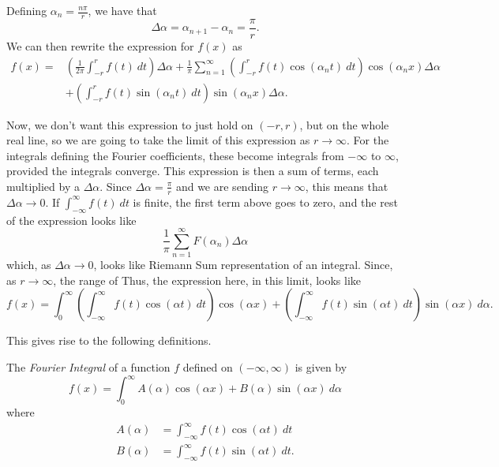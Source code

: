Defining $\alpha_n = \frac{n\pi}{r}$, we have that \[ \Delta \alpha = \alpha_{n+1} - \alpha_n = \frac{\pi}{r}. \] We can then rewrite the expression for $f(x)$ as 
\[ \begin{split} 
f(x) =&  \left( \frac{1}{2\pi} \int_{-r}^{r} f(t)\ dt \right) \Delta \alpha  + \frac{1}{\pi} \sum_{n=1}^\infty \left( \int_{-r}^r f(t) \cos\left(\alpha_n t\right)\ dt\right) \cos\left(\alpha_n x\right) \Delta \alpha  \\
&+ \left(\int_{-r}^r f(t) \sin\left(\alpha_n t\right)\ dt\right) \sin\left(\alpha_n x\right) \Delta \alpha.
\end{split} \]

Now, we don't want this expression to just hold on $(-r, r)$, but on the whole real line, so we are going to take the limit of this expression as $r \rightarrow \infty$. For the integrals defining the Fourier coefficients, these become integrals from $-\infty$ to $\infty$, provided the integrals converge. This expression is then a sum of terms, each multiplied by a $\Delta \alpha$. Since $\Delta \alpha = \frac{\pi}{r}$ and we are sending $r\rightarrow \infty$, this means that $\Delta \alpha \rightarrow 0$. If $\int_{-\infty}^\infty f(t)\ dt$ is finite, the first term above goes to zero, and the rest of the expression looks like
\[ \frac{1}{\pi} \sum_{n=1}^\infty F(\alpha_n) \Delta \alpha \] which, as $\Delta \alpha \rightarrow 0$, looks like Riemann Sum representation of an integral. Since, as $r \rightarrow \infty$, the range of Thus, the expression here, in this limit, looks like
\[ f(x) = \int_0^\infty \left( \int_{-\infty}^\infty f(t) \cos\left(\alpha t\right)\ dt\right) \cos\left(\alpha x\right) + \left( \int_{-\infty}^\infty f(t) \sin\left(\alpha t\right)\ dt\right) \sin\left(\alpha x\right) \ d\alpha. \]

This gives rise to the following definitions.

\begin{definition}
The \emph{Fourier Integral} of a function $f$ defined on $(-\infty, \infty)$ is given by 
\[ f(x) = \int_0^\infty A(\alpha) \cos\left( \alpha x\right) + B(\alpha) \sin\left(\alpha x \right)\ d\alpha \] where
\[ \begin{split} A(\alpha) &=  \int_{-\infty}^\infty f(t) \cos\left(\alpha t\right)\ dt \\ B(\alpha) &= \int_{-\infty}^\infty f(t) \sin\left(\alpha t\right)\ dt. \end{split} \]
\end{definition}

